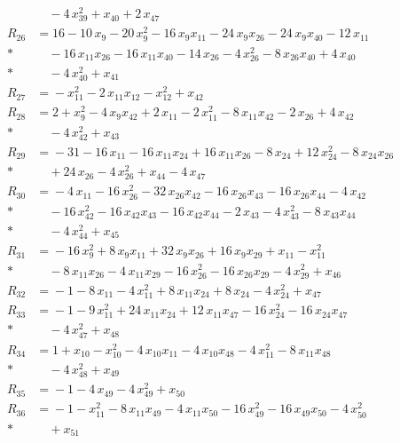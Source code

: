 \begin{align*}
&\quad{} -4\,x_{39}^{2} +x_{40} +2\,x_{47} \\[2pt]
R_{26} &={} 16 -10\,x_{9} -20\,x_{9}^{2} -16\,x_{9} x_{11} -24\,x_{9} x_{26} -24\,x_{9} x_{40} -12\,x_{11} \\*
&\quad{} -16\,x_{11} x_{26} -16\,x_{11} x_{40} -14\,x_{26} -4\,x_{26}^{2} -8\,x_{26} x_{40} +4\,x_{40} \\*
&\quad{} -4\,x_{40}^{2} +x_{41} \\[2pt]
R_{27} &={} -x_{11}^{2} -2\,x_{11} x_{12} -x_{12}^{2} +x_{42} \\[2pt]
R_{28} &={} 2 +x_{9}^{2} -4\,x_{9} x_{42} +2\,x_{11} -2\,x_{11}^{2} -8\,x_{11} x_{42} -2\,x_{26} +4\,x_{42} \\*
&\quad{} -4\,x_{42}^{2} +x_{43} \\[2pt]
R_{29} &={} -31 -16\,x_{11} -16\,x_{11} x_{24} +16\,x_{11} x_{26} -8\,x_{24} +12\,x_{24}^{2} -8\,x_{24} x_{26} \\*
&\quad{} +24\,x_{26} -4\,x_{26}^{2} +x_{44} -4\,x_{47} \\[2pt]
R_{30} &={} -4\,x_{11} -16\,x_{26}^{2} -32\,x_{26} x_{42} -16\,x_{26} x_{43} -16\,x_{26} x_{44} -4\,x_{42} \\*
&\quad{} -16\,x_{42}^{2} -16\,x_{42} x_{43} -16\,x_{42} x_{44} -2\,x_{43} -4\,x_{43}^{2} -8\,x_{43} x_{44} \\*
&\quad{} -4\,x_{44}^{2} +x_{45} \\[2pt]
R_{31} &={} -16\,x_{9}^{2} +8\,x_{9} x_{11} +32\,x_{9} x_{26} +16\,x_{9} x_{29} +x_{11} -x_{11}^{2} \\*
&\quad{} -8\,x_{11} x_{26} -4\,x_{11} x_{29} -16\,x_{26}^{2} -16\,x_{26} x_{29} -4\,x_{29}^{2} +x_{46} \\[2pt]
R_{32} &={} -1 -8\,x_{11} -4\,x_{11}^{2} +8\,x_{11} x_{24} +8\,x_{24} -4\,x_{24}^{2} +x_{47} \\[2pt]
R_{33} &={} -1 -9\,x_{11}^{2} +24\,x_{11} x_{24} +12\,x_{11} x_{47} -16\,x_{24}^{2} -16\,x_{24} x_{47} \\*
&\quad{} -4\,x_{47}^{2} +x_{48} \\[2pt]
R_{34} &={} 1 +x_{10} -x_{10}^{2} -4\,x_{10} x_{11} -4\,x_{10} x_{48} -4\,x_{11}^{2} -8\,x_{11} x_{48} \\*
&\quad{} -4\,x_{48}^{2} +x_{49} \\[2pt]
R_{35} &={} -1 -4\,x_{49} -4\,x_{49}^{2} +x_{50} \\[2pt]
R_{36} &={} -1 -x_{11}^{2} -8\,x_{11} x_{49} -4\,x_{11} x_{50} -16\,x_{49}^{2} -16\,x_{49} x_{50} -4\,x_{50}^{2} \\*
&\quad{} +x_{51} \\[2pt]

\end{align*}
